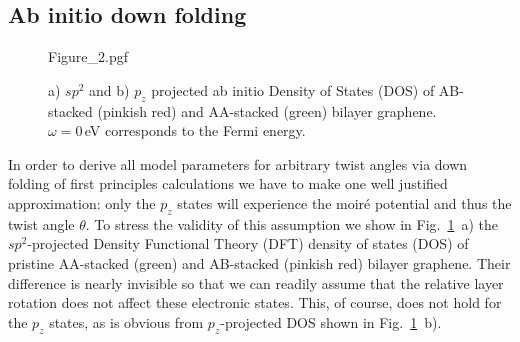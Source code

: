 \subsection{Ab initio down folding}
    
\begin{figure}
    \centering
    {Figure_2.pgf}
    \caption{a) $sp^2$ and b) $p_z$ projected ab initio Density of States (DOS) of AB-stacked (pinkish red) and AA-stacked (green) bilayer graphene. $\omega=0\,$eV corresponds to the Fermi energy.}
    \label{fig:mat22:ab} 
\end{figure}
    
In order to derive all model parameters for arbitrary twist angles via down folding of first principles calculations we have to make one well justified approximation: only the $p_z$ states will experience the moir\'e potential and thus the twist angle $\theta$.  To stress the validity of this assumption we show in Fig.~\ref{fig:mat22:ab}~a) the $sp^2$-projected Density Functional Theory (DFT) density of states (DOS) of pristine AA-stacked (green) and AB-stacked (pinkish red) bilayer graphene. Their difference is nearly invisible so that we can readily assume that the relative layer rotation does not affect these electronic states. This, of course, does not hold for the $p_z$ states, as is obvious from $p_z$-projected DOS shown in Fig.~\ref{fig:mat22:ab}~b).
            
